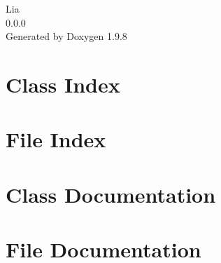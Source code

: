 \documentclass[twoside]{book}
\newcommand{\+}{\discretionary{\mbox{\scriptsize$\hookleftarrow$}}{}{}}
\newcommand{\clearemptydoublepage}{%
    \newpage{\pagestyle{empty}\cleardoublepage}%
  }
\begin{document}
  \raggedbottom
    \hypersetup{pageanchor=false,
                bookmarksnumbered=true,
                pdfencoding=unicode
               }
  \begin{titlepage}
  \vspace*{7cm}
  \begin{center}%
  {\Large Lia}\\
  [1ex]\large 0.\+0.\+0 \\
  \vspace*{1cm}
  {\large Generated by Doxygen 1.9.8}\\
  \end{center}
  \end{titlepage}
  \clearemptydoublepage
  \tableofcontents
  \clearemptydoublepage
  \hypersetup{pageanchor=true}


\chapter{Class Index}

\chapter{File Index}

\chapter{Class Documentation}

\chapter{File Documentation}













  \backmatter
  \newpage
  \clearemptydoublepage
  \printindex
\end{document}
